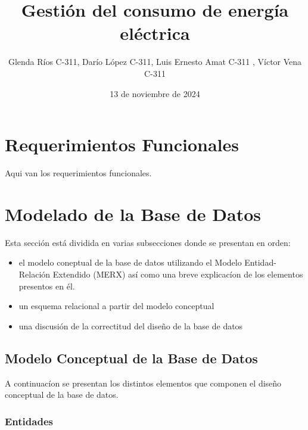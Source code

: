 \documentclass{article}
\title{Gestión del consumo de energía eléctrica}
\author{Glenda Ríos C-311, Darío López C-311, Luis Ernesto Amat C-311 , Víctor Vena C-311}
\date{13 de noviembre de 2024}
\begin{document}
\maketitle

\section{Requerimientos Funcionales}
Aqui van los requerimientos funcionales.

\section{Modelado de la Base de Datos}
Esta sección está dividida en varias subsecciones donde se presentan en orden:
\begin{itemize}
\item el modelo coneptual de la base de datos utilizando el Modelo Entidad-Relación Extendido (MERX) así como una breve explicacíon de los elementos presentos en él.
\item un esquema relacional a partir del modelo conceptual
\item una discusión de la correctitud del diseño de la base de datos
\end{itemize}
\subsection{Modelo Conceptual de la Base de Datos}
A continuacíon se presentan los distintos elementos que componen el diseño conceptual de la base de datos.

\subsubsection{Entidades}
\end{document}
